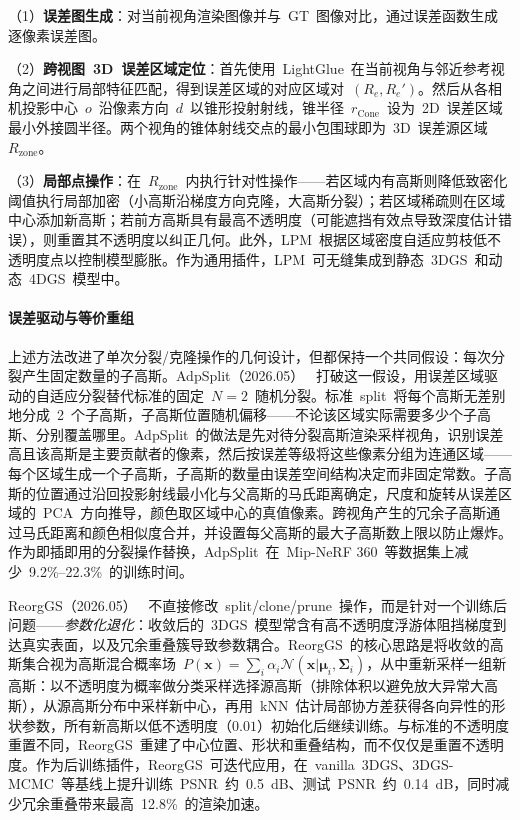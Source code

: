 （1）\textbf{误差图生成}：对当前视角渲染图像并与~GT~图像对比，通过误差函数生成逐像素误差图。

（2）\textbf{跨视图~3D~误差区域定位}：首先使用~LightGlue~在当前视角与邻近参考视角之间进行局部特征匹配，得到误差区域的对应区域对~$(R_e, R_e')$。然后从各相机投影中心~$o$~沿像素方向~$d$~以锥形投射射线，锥半径~$r_{\text{Cone}}$~设为~2D~误差区域最小外接圆半径。两个视角的锥体射线交点的最小包围球即为~3D~误差源区域~$R_{\text{zone}}$。

（3）\textbf{局部点操作}：在~$R_{\text{zone}}$~内执行针对性操作——若区域内有高斯则降低致密化阈值执行局部加密（小高斯沿梯度方向克隆，大高斯分裂）；若区域稀疏则在区域中心添加新高斯；若前方高斯具有最高不透明度（可能遮挡有效点导致深度估计错误），则重置其不透明度以纠正几何。此外，LPM~根据区域密度自适应剪枝低不透明度点以控制模型膨胀。作为通用插件，LPM~可无缝集成到静态~3DGS~和动态~4DGS~模型中。

\paragraph{误差驱动与等价重组}

上述方法改进了单次分裂/克隆操作的几何设计，但都保持一个共同假设：每次分裂产生固定数量的子高斯。AdpSplit（2026.05）~\cite{2605_06876} 打破这一假设，用误差区域驱动的自适应分裂替代标准的固定~$N{=}2$~随机分裂。标准~split~将每个高斯无差别地分成~2~个子高斯，子高斯位置随机偏移——不论该区域实际需要多少个子高斯、分别覆盖哪里。AdpSplit~的做法是先对待分裂高斯渲染采样视角，识别误差高且该高斯是主要贡献者的像素，然后按误差等级将这些像素分组为连通区域——每个区域生成一个子高斯，子高斯的数量由误差空间结构决定而非固定常数。子高斯的位置通过沿回投影射线最小化与父高斯的马氏距离确定，尺度和旋转从误差区域的~PCA~方向推导，颜色取区域中心的真值像素。跨视角产生的冗余子高斯通过马氏距离和颜色相似度合并，并设置每父高斯的最大子高斯数上限以防止爆炸。作为即插即用的分裂操作替换，AdpSplit~在~Mip-NeRF 360~等数据集上减少~9.2\%–22.3\%~的训练时间。

ReorgGS（2026.05）~\cite{2605_08739} 不直接修改~split/clone/prune~操作，而是针对一个训练后问题——\emph{参数化退化}：收敛后的~3DGS~模型常含有高不透明度浮游体阻挡梯度到达真实表面，以及冗余重叠簇导致参数耦合。ReorgGS~的核心思路是将收敛的高斯集合视为高斯混合概率场~$P(\mathbf{x}) = \sum_i \alpha_i \mathcal{N}(\mathbf{x} | \boldsymbol{\mu}_i, \boldsymbol{\Sigma}_i)$，从中重新采样一组新高斯：以不透明度为概率做分类采样选择源高斯（排除体积以避免放大异常大高斯），从源高斯分布中采样新中心，再用~kNN~估计局部协方差获得各向异性的形状参数，所有新高斯以低不透明度（$0.01$）初始化后继续训练。与标准的不透明度重置不同，ReorgGS~重建了中心位置、形状和重叠结构，而不仅仅是重置不透明度。作为后训练插件，ReorgGS~可迭代应用，在~vanilla~3DGS、3DGS-MCMC~等基线上提升训练~PSNR~约~0.5~dB、测试~PSNR~约~0.14~dB，同时减少冗余重叠带来最高~12.8\%~的渲染加速。

